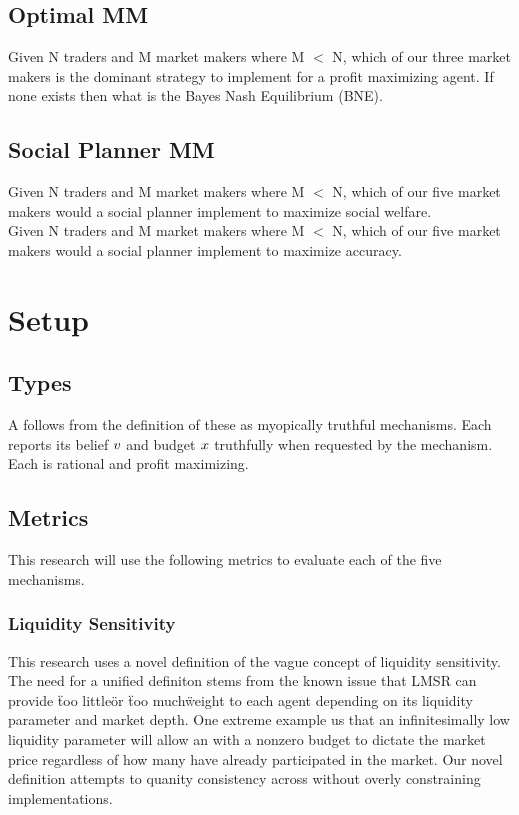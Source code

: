 \subsection{Optimal MM}
Given N traders and M market makers where M $<$ N, which of our three market makers is the
dominant strategy to implement for a profit maximizing agent. 
If none exists then what is the Bayes Nash Equilibrium (BNE).\\

\subsection{Social Planner MM}
Given N traders and M market makers where M $<$ N, which of our five market makers would
a social planner implement to maximize social welfare.\\

Given N traders and M market makers where M $<$ N, which of our five market makers would
a social planner implement to maximize accuracy.

\section{Setup}

\subsection{Types}
A  follows from the definition of these  as myopically truthful
mechanisms. Each  reports its belief $v$ and budget $x$
truthfully when requested by the mechanism. Each  is rational and profit
maximizing.

\subsection{Metrics}
This research will use the following metrics to evaluate each of the five mechanisms.
\subsubsection{Liquidity Sensitivity}
This research uses a novel definition of the vague concept of liquidity sensitivity. The need
for a unified definiton stems from the known issue that LMSR can provide \"too little\" or 
\"too much\" weight to each agent depending on its liquidity parameter and market depth. One extreme
example us that an infinitesimally low liquidity parameter will allow an  with a nonzero
budget to dictate the market price regardless of how many  have already participated in
the market. Our novel definition attempts to quanity consistency across  without
overly constraining implementations. \\

